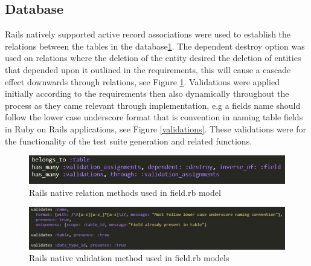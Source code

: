\documentclass[a4paper,12pt]{article}
\begin{document}
\subsection{Database}

\par Rails natively supported active record associations were used to establish the relations between the tables in the database\cite{railsara}\ref{fig:relations}. The dependent destroy option was used on relations where the deletion of the entity desired the deletion of entities that depended upon it outlined in the requirements, this will cause a cascade effect downwards through relations, see Figure \ref{fig:relations}. Validations were applied initially according to the requirements then also dynamically throughout the process as they came relevant through implementation, e.g a fields name should follow the lower case underscore format that is convention in naming table fields in Ruby on Rails applications, see Figure \ref{validations}. These validations were for the functionality of the test suite generation and related functions.
\begin{figure}
\includegraphics[width=\linewidth]{screenshots/relations}
\caption{Rails native relation methods used in field.rb model}
\label{fig:relations}
\end{figure}

\begin{figure}
\includegraphics[width=\linewidth]{screenshots/validations}
\caption{Rails native validation method used in field.rb models}
\label{fig:validations}
\end{figure}
\end{document}
